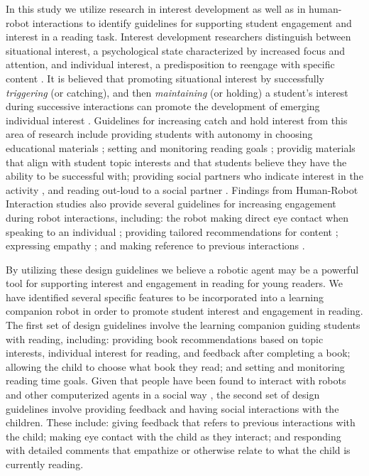 \documentclass{sigchi}
\begin{document}
In this study we utilize research in interest development as well as in human-robot interactions to identify guidelines for supporting student engagement and interest in a reading task. Interest development researchers distinguish between situational interest,  a psychological state characterized by increased focus and attention, and individual interest, a predisposition to reengage with specific content \cite{Hidi:2006}.  It is believed that promoting situational interest by successfully \textit{triggering} (or catching), and then \textit{maintaining} (or holding) a student's interest during successive interactions can promote the development of emerging individual interest \cite{Hidi:2006, Mitchell:1993}. Guidelines for increasing catch and hold interest from this area of research include providing students with autonomy in choosing educational materials \cite{Jones:2011}; setting and monitoring reading goals \cite{Cabral:2015}; providig materials that align with student topic interests \cite{Ainley:2002} and that students believe they have the ability to be successful with; providing social partners who indicate interest in the activity \cite{Sansone:2005}, and reading out-loud to a social partner \cite{Rasinski:2003}. Findings from Human-Robot Interaction studies also provide several guidelines for increasing engagement during robot interactions, including: the robot making direct eye contact when speaking to an individual \cite{Mutlu:2011}; providing tailored recommendations for content \cite{Lim:2013}; expressing empathy \cite{Leite:2012}; and making reference to previous interactions \cite{Leite:2009}.

By utilizing these design guidelines we believe a robotic agent may be a powerful tool for supporting interest and engagement in reading for young readers. We have identified several specific features to be incorporated into a learning companion robot in order to promote student interest and engagement in reading. The first set of design guidelines involve the learning companion guiding students with reading, including: providing book recommendations based on topic interests, individual interest for reading, and feedback after completing a book; allowing the child to choose what book they read; and setting and monitoring reading time goals. Given that people have been found to interact with robots and other computerized agents in a social way \cite{Bickmore:2005}, the second set of design guidelines involve providing feedback and having social interactions with the children. These include: giving feedback that refers to previous interactions with the child; making eye contact with the child as they interact; and responding with detailed comments that empathize or otherwise relate to what the child is currently reading.
\end{document}
